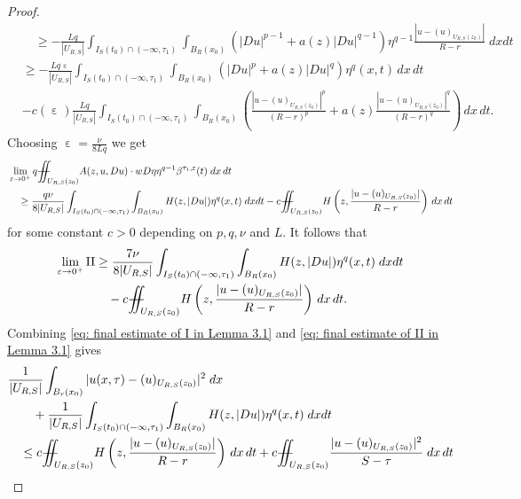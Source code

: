 \documentclass[notitlepage,11pt,reqno]{amsart}
\theoremstyle{definition}
\numberwithin{equation}{section}
\newcommand{\iintss}{{\int\hspace{-0.28cm}\int}}
\newcommand{ \miints }{{\iintss\hspace{-0.56cm} -\hspace{-0.15cm}-}}
\newcommand{\miint}[1]{{\miints_{\hspace{-0.13cm}#1}}}
\begin{document}
\begin{proof}
\begin{align*}
        &\quad \geq -\frac{Lq}{|U_{R, S}|}\int_{I_S(t_0)\cap(-\infty,\tau_1)}\int_{B_R(x_0)} \left(|Du|^{p-1}+a(z)|Du|^{q-1}\right)\eta^{q-1}\frac{|u-(u)_{U_{R, S}(z_0)}|}{R-r}\; dx dt\\
        &\geq -\frac{Lq \upepsilon}{|U_{R, S}|}\int_{I_S(t_0)\cap(-\infty,\tau_1)}\int_{B_R(x_0)}\left(|Du|^p+a(z)|Du|^q\right)\eta^q(x, t)\, dx\, dt \\
        &-c(\upepsilon)\frac{Lq }{|U_{R, S}|}\int_{I_S(t_0)\cap(-\infty,\tau_1)}\int_{B_R(x_0)}\left(\frac{|u-(u)_{U_{R, S}(z_0)}|^p}{(R-r)^p}+a(z)\frac{|u-(u)_{U_{R, S}(z_0)}|^q}{(R-r)^q}\right)\,dx\, dt.
    \end{align*}
    Choosing $\upepsilon=\frac{\nu}{8Lq}$ we get
    \begin{align*}
       &\lim_{\varepsilon \rightarrow 0^+} q\miint{U_{R,S}(z_0)} A(z,u, Du)\cdot w D\eta \eta^{q-1}\beta^{\tau_1, \varepsilon}(t) \; dx\, dt\\
        &\quad \ge \frac{q\nu}{8|U_{R, S}|}\int_{I_S(t_0)\cap(-\infty,\tau_1)} \int_{B_R(x_0)} H(z,|Du|)\eta^q(x, t) \;dx dt -c\miint{U_{R,S}(z_0)} H\left(z,\frac{|u-(u)_{U_{R, S}(z_0)}|}{R-r}\right) \,dx \,dt
    \end{align*}
    for some constant $c>0$ depending on $p,q,\nu$ and $L.$
    It follows that 
    \begin{equation}\label{eq: final estimate of II in Lemma 3.1}
        \begin{aligned}
            \lim_{\varepsilon \rightarrow 0^+} \mathrm{II} &\geq \frac{7\nu}{8|U_{R, S}|} \int_{I_S(t_0)\cap(-\infty,\tau_1)} \int_{B_R(x_0)} H(z,|Du|)\eta^q(x, t) \;dx dt\\
            &\quad -c\miint{U_{R,S}(z_0)} H\left(z,\frac{|u-(u)_{U_{R, S}(z_0)}|}{R-r}\right) \,dx\, dt.
        \end{aligned}
    \end{equation}
    Combining \eqref{eq: final estimate of I in Lemma 3.1} and \eqref{eq: final estimate of II in Lemma 3.1} gives
    \begin{align*}
        &\frac{1}{|U_{R, S}|}\int_{B_r(x_0)} |u(x,\tau)-(u)_{U_{R, S}(z_0)}|^2\; dx\\
        &\qquad +\frac{1}{|U_{R, S}|} \int_{I_S(t_0)\cap(-\infty,\tau_1)} \int_{B_R(x_0)} H(z,|Du|)\eta^q(x, t) \;dx dt\\
        &\quad \leq c\miint{U_{R,S}(z_0)} H\left(z,\frac{|u-(u)_{U_{R, S}(z_0)}|}{R-r}\right) \,dx\,dt+ c \miint{U_{R,S}(z_0)}\frac{|u-(u)_{U_{R,S}(z_0)}|^2}{S-\tau} \; dx\,dt
    \end{align*}

\end{proof}
\end{document}
